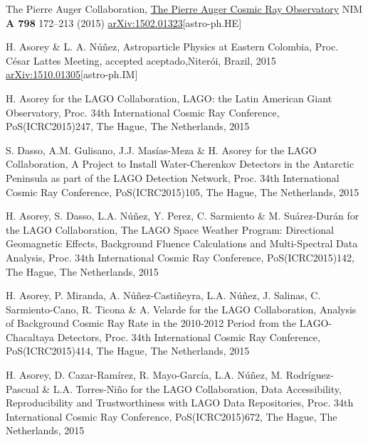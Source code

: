 \begin{etaremune}
\item {}The Pierre Auger Collaboration, \href{http://dx.doi.org/10.1016/j.nima.2015.06.058}{{The Pierre Auger Cosmic Ray Observatory}} NIM {\bf{A 798}} 172--213 (2015) \href{http://arxiv.org/abs/1502.01323}{arXiv:1502.01323}[astro-ph.HE]

\item {}H. Asorey \& L. A. Núñez, {{Astroparticle Physics at Eastern Colombia}}, \en Proc. César Lattes Meeting, \ifeng accepted \else aceptado,\fi Niterói, Brazil, 2015 \href{http://arxiv.org/abs/1510.01305}{arXiv:1510.01305}[astro-ph.IM]

\item {}H. Asorey for the LAGO Collaboration, {{LAGO: the Latin American Giant Observatory}}, \en Proc. 34th International Cosmic Ray Conference, PoS(ICRC2015)247, The Hague, The Netherlands, 2015

\item {}S. Dasso, A.M. Gulisano, J.J. Masías-Meza \& H. Asorey for the LAGO Collaboration, {{A Project to Install Water-Cherenkov Detectors in the Antarctic Peninsula as part of the LAGO Detection Network}}, \en Proc. 34th International Cosmic Ray Conference, PoS(ICRC2015)105, The Hague, The Netherlands, 2015

\item {}H. Asorey, S. Dasso, L.A. Núñez, Y. Perez, C. Sarmiento \& M. Suárez-Durán for the LAGO Collaboration, {{The LAGO Space Weather Program: Directional Geomagnetic Effects, Background Fluence Calculations and Multi-Spectral Data Analysis}}, \en Proc. 34th International Cosmic Ray Conference, PoS(ICRC2015)142, The Hague, The Netherlands, 2015

\item {}H. Asorey, P. Miranda, A. Núñez-Castiñeyra, L.A. Núñez, J. Salinas, C. Sarmiento-Cano, R. Ticona \& A. Velarde for the LAGO Collaboration, {{Analysis of Background Cosmic Ray Rate in the 2010-2012 Period from the LAGO-Chacaltaya Detectors}}, \en Proc. 34th International Cosmic Ray Conference, PoS(ICRC2015)414, The Hague, The Netherlands, 2015

\item {}H. Asorey, D. Cazar-Ramírez, R. Mayo-García, L.A. Núñez, M. Rodríguez-Pascual \& L.A. Torres-Niño for the LAGO Collaboration, {{Data Accessibility, Reproducibility and Trustworthiness with LAGO Data Repositories}}, \en Proc. 34th International Cosmic Ray Conference, PoS(ICRC2015)672, The Hague, The Netherlands, 2015


\end{etaremune}

